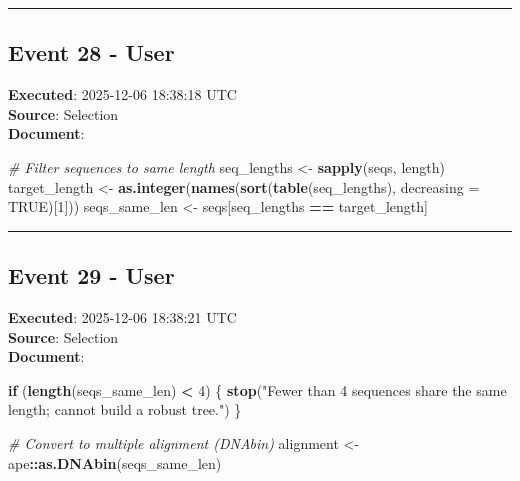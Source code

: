 \documentclass[
  11pt,
]{article}
\newenvironment{Shaded}{\begin{snugshade}}{\end{snugshade}}
\newcommand{\AttributeTok}[1]{\textcolor[rgb]{0.13,0.29,0.53}{#1}}
\newcommand{\CommentTok}[1]{\textcolor[rgb]{0.56,0.35,0.01}{\textit{#1}}}
\newcommand{\ConstantTok}[1]{\textcolor[rgb]{0.56,0.35,0.01}{#1}}
\newcommand{\ControlFlowTok}[1]{\textcolor[rgb]{0.13,0.29,0.53}{\textbf{#1}}}
\newcommand{\DecValTok}[1]{\textcolor[rgb]{0.00,0.00,0.81}{#1}}
\newcommand{\FunctionTok}[1]{\textcolor[rgb]{0.13,0.29,0.53}{\textbf{#1}}}
\newcommand{\NormalTok}[1]{#1}
\newcommand{\OtherTok}[1]{\textcolor[rgb]{0.56,0.35,0.01}{#1}}
\newcommand{\SpecialCharTok}[1]{\textcolor[rgb]{0.81,0.36,0.00}{\textbf{#1}}}
\newcommand{\StringTok}[1]{\textcolor[rgb]{0.31,0.60,0.02}{#1}}
\begin{document}
\begin{center}\rule{0.5\linewidth}{0.5pt}\end{center}

\subsection{Event 28 - User}\label{event-28---user}

\textbf{Executed}: 2025-12-06 18:38:18 UTC\\
\textbf{Source}: Selection\\
\textbf{Document}:

\begin{Shaded}
\begin{Highlighting}[]
\CommentTok{\# Filter sequences to same length}
\NormalTok{seq\_lengths }\OtherTok{\textless{}{-}} \FunctionTok{sapply}\NormalTok{(seqs, length)}
\NormalTok{target\_length }\OtherTok{\textless{}{-}} \FunctionTok{as.integer}\NormalTok{(}\FunctionTok{names}\NormalTok{(}\FunctionTok{sort}\NormalTok{(}\FunctionTok{table}\NormalTok{(seq\_lengths), }\AttributeTok{decreasing =} \ConstantTok{TRUE}\NormalTok{)[}\DecValTok{1}\NormalTok{]))}
\NormalTok{seqs\_same\_len }\OtherTok{\textless{}{-}}\NormalTok{ seqs[seq\_lengths }\SpecialCharTok{==}\NormalTok{ target\_length]}
\end{Highlighting}
\end{Shaded}

\begin{center}\rule{0.5\linewidth}{0.5pt}\end{center}

\subsection{Event 29 - User}\label{event-29---user}

\textbf{Executed}: 2025-12-06 18:38:21 UTC\\
\textbf{Source}: Selection\\
\textbf{Document}:

\begin{Shaded}
\begin{Highlighting}[]
\ControlFlowTok{if}\NormalTok{ (}\FunctionTok{length}\NormalTok{(seqs\_same\_len) }\SpecialCharTok{\textless{}} \DecValTok{4}\NormalTok{) \{}
  \FunctionTok{stop}\NormalTok{(}\StringTok{"Fewer than 4 sequences share the same length; cannot build a robust tree."}\NormalTok{)}
\NormalTok{\}}

\CommentTok{\# Convert to multiple alignment (DNAbin)}
\NormalTok{alignment }\OtherTok{\textless{}{-}}\NormalTok{ ape}\SpecialCharTok{::}\FunctionTok{as.DNAbin}\NormalTok{(seqs\_same\_len)}
\end{Highlighting}
\end{Shaded}
\end{document}
